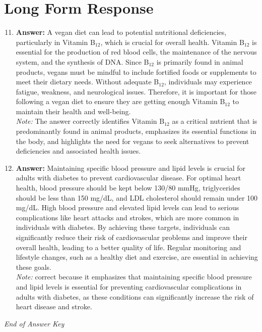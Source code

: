 \documentclass[12pt]{article}
\begin{document}
\section*{Long Form Response}
\begin{enumerate}[label=\arabic*.]
\setcounter{enumi}{10}
\item \textbf{Answer:} A vegan diet can lead to potential nutritional deficiencies, particularly in Vitamin B$_{12}$, which is crucial for overall health. Vitamin B$_{12}$ is essential for the production of red blood cells, the maintenance of the nervous system, and the synthesis of DNA. Since B$_{12}$ is primarily found in animal products, vegans must be mindful to include fortified foods or supplements to meet their dietary needs. Without adequate B$_{12}$, individuals may experience fatigue, weakness, and neurological issues. Therefore, it is important for those following a vegan diet to ensure they are getting enough Vitamin B$_{12}$ to maintain their health and well-being.
\\ \textit{Note:} The answer correctly identifies Vitamin B$_{12}$ as a critical nutrient that is predominantly found in animal products, emphasizes its essential functions in the body, and highlights the need for vegans to seek alternatives to prevent deficiencies and associated health issues.
\item \textbf{Answer:} Maintaining specific blood pressure and lipid levels is crucial for adults with diabetes to prevent cardiovascular disease. For optimal heart health, blood pressure should be kept below 130/80 mmHg, triglycerides should be less than 150 mg/dL, and LDL cholesterol should remain under 100 mg/dL. High blood pressure and elevated lipid levels can lead to serious complications like heart attacks and strokes, which are more common in individuals with diabetes. By achieving these targets, individuals can significantly reduce their risk of cardiovascular problems and improve their overall health, leading to a better quality of life. Regular monitoring and lifestyle changes, such as a healthy diet and exercise, are essential in achieving these goals.
\\ \textit{Note:} correct because it emphasizes that maintaining specific blood pressure and lipid levels is essential for preventing cardiovascular complications in adults with diabetes, as these conditions can significantly increase the risk of heart disease and stroke.
\end{enumerate}

\vfill
\noindent\textit{End of Answer Key}
\end{document}
